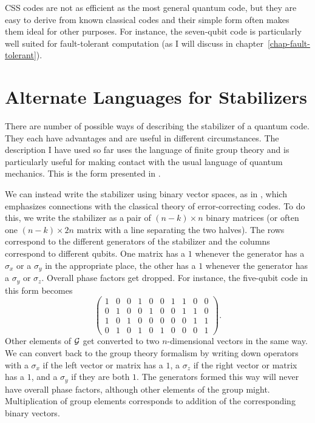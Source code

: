 \documentclass{report}
\newcommand{\G}{{\cal G}}
\newcommand{\X}{\sigma_x}
\newcommand{\Z}{\sigma_z}
\newcommand{\Y}{\sigma_y}
\begin{document}
CSS codes are not as efficient as the most general quantum 
code, but they are easy to derive from known classical codes and their 
simple form often makes them ideal for other purposes.  For instance, the 
seven-qubit code is particularly well suited for fault-tolerant computation 
(as I will discuss in chapter~\ref{chap-fault-tolerant}).

\section{Alternate Languages for Stabilizers}
\label{sec-alternate}

There are number of possible ways of describing the stabilizer of a 
quantum code.   They each have advantages and are useful in different 
circumstances.  The description I have used so far uses the language of 
finite group theory and is particularly useful for making contact with the 
usual language of quantum mechanics.  This is the form presented in 
\cite{gottesman-stab}.

We can instead write the stabilizer using binary vector spaces, as in 
\cite{calderbank-stab}, which emphasizes connections with the classical 
theory of error-correcting codes.  To do this, we write the stabilizer as a 
pair of $(n-k) \times n$ binary matrices (or often one $(n-k) \times 2n$ 
matrix with a line separating the two halves).  The rows correspond to the 
different generators of the stabilizer and the columns correspond to 
different qubits.  One matrix has a $1$ whenever the generator has a $\X$ 
or a $\Y$ in the appropriate place, the other has a $1$ whenever the 
generator has a $\Y$ or $\Z$.  Overall phase factors get dropped.  For 
instance, the five-qubit code in this form becomes
\begin{equation}
\left( \begin{array}{ccccc|ccccc}
1 & 0 & 0 & 1 & 0 & 0 & 1 & 1 & 0 & 0 \\
0 & 1 & 0 & 0 & 1 & 0 & 0 & 1 & 1 & 0 \\
1 & 0 & 1 & 0 & 0 & 0 & 0 & 0 & 1 & 1 \\
0 & 1 & 0 & 1 & 0 & 1 & 0 & 0 & 0 & 1
\end{array} \right).
\end{equation}
Other elements of $\G$ get converted to two $n$-dimensional vectors in the 
same way.  We can convert back to the group theory formalism by writing 
down operators with a $\X$ if the left vector or matrix has a $1$, a $\Z$ if 
the right vector or matrix has a $1$, and a $\Y$ if they are both $1$.  The 
generators formed this way will never have overall phase factors, although 
other elements of the group might.  Multiplication of group elements
corresponds to addition of the corresponding binary vectors.
\end{document}

